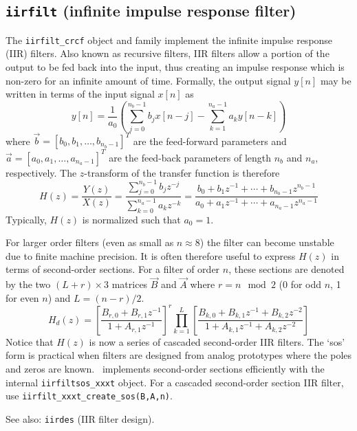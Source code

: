 \subsection{{\tt iirfilt} (infinite impulse response filter)}
\label{module:filter:iirfilt}
The {\tt iirfilt\_crcf} object and family implement the infinite impulse
response (IIR) filters.
Also known as recursive filters, IIR filters allow a portion of the output to
be fed back into the input, thus creating an impulse response which is
non-zero for an infinite amount of time.
Formally, the output signal $y[n]$ may be written in terms of the input signal
$x[n]$ as
\[
    y[n] = \frac{1}{a_0} \left(
           \sum_{j=0}^{n_b-1}{ b_j x[n-j] } -
           \sum_{k=1}^{n_a-1}{ a_k y[n-k] }
           \right)
\]
where $\vec{b} = [b_0,b_1,\ldots,b_{n_b-1}]^T$ are the feed-forward parameters
and   $\vec{a} = [a_0,a_1,\ldots,a_{n_a-1}]^T$ are the feed-back parameters
of length $n_b$ and $n_a$, respectively.
The $z$-transform of the transfer function is therefore
\[
    H(z) = \frac{Y(z)}{X(z)}
         = \frac{\sum\limits_{j=0}^{n_b-1}{b_j z^{-j}}}
                {\sum\limits_{k=0}^{n_a-1}{a_k z^{-k}}}
         = \frac{ b_0 + b_1 z^{-1} + \cdots + b_{n_b-1} z^{n_b-1}}
                { a_0 + a_1 z^{-1} + \cdots + a_{n_a-1} z^{n_a-1}}
\]
Typically, $H(z)$ is normalized such that $a_0=1$.

For larger order filters (even as small as $n\approx 8$) the filter can become
unstable due to finite machine precision.
It is often therefore useful to express $H(z)$ in terms of second-order
sections.
For a filter of order $n$, these sections are denoted by the two
$(L+r)\times 3$ matrices $\vec{B}$ and $\vec{A}$
where $r=n \mod 2$ (0 for odd $n$, 1 for even $n$) and $L=(n-r)/2$.
\[
    H_d(z) = 
             \left[
                \frac{B_{r,0} + B_{r,1}z^{-1}}
                     {1       + A_{r,1}z^{-1}}
             \right]^r
             \prod_{k=1}^{L} {\left[
                \frac{B_{k,0} + B_{k,1}z^{-1} + B_{k,2}z^{-2}}
                     {1       + A_{k,1}z^{-1} + A_{k,2}z^{-2}}
             \right]}
\]
Notice that $H(z)$ is now a series of cascaded second-order IIR filters.
The `sos' form is practical when filters are designed from analog prototypes
where the poles and zeros are known.
\liquid\ implements second-order sections efficiently with the internal
{\tt iirfiltsos\_xxxt} object.
For a cascaded second-order section IIR filter, use
{\tt iirfilt\_xxxt\_create\_sos(B,A,n)}.

See also: {\tt iirdes} (IIR filter design).


